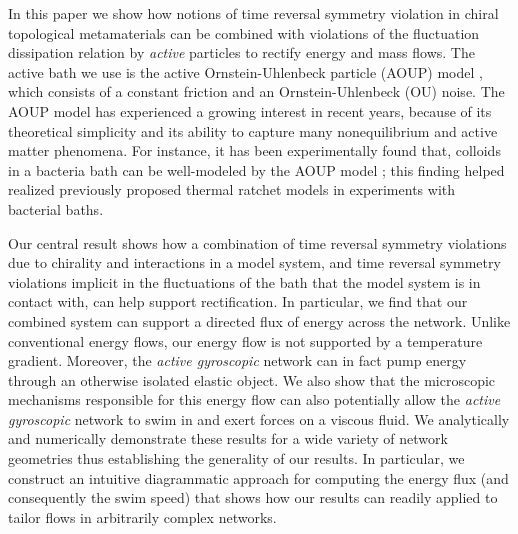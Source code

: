 \documentclass[
 preprint,
 preprintnumbers,
 amsmath,amssymb,
 aps,
 pre,
 longbibliography,
 superscriptaddress,
 10pt, twocolumn
]{revtex4-1}
\begin{document}

In this paper we show how notions of time reversal symmetry violation in chiral topological metamaterials can be combined with violations of the fluctuation dissipation relation by \textit{active} particles to rectify energy and mass flows. The active bath we use is the active Ornstein-Uhlenbeck particle (AOUP) model \cite{Fodor2016HowFar}, which consists of a constant friction and an Ornstein-Uhlenbeck (OU) noise. The AOUP model has experienced a growing interest in recent years, because of its theoretical simplicity and its ability to capture many nonequilibrium and active matter phenomena.
For instance, it has been experimentally found that, colloids in a bacteria bath can be well-modeled by the AOUP model \cite{Wu2000ParticleDiffusion}; this finding helped realized previously proposed thermal ratchet models \cite{Magnasco1993ForcedThermal} in experiments with bacterial baths. \cite{Koumakis2013TargetedDelivery}

Our central result shows how a combination of time reversal symmetry violations due to chirality and interactions in a model system, and time reversal symmetry violations implicit in the fluctuations of the bath that the model system is in contact with, can help support rectification. In particular, we find that our combined system can support a directed flux of energy across the network. Unlike conventional energy flows, our energy flow is not supported by a temperature gradient. Moreover, the \textit{active gyroscopic} network can in fact pump energy through an otherwise isolated elastic object. We also show that the microscopic mechanisms responsible for this energy flow can also potentially allow the \textit{active gyroscopic} network to swim in and exert forces on a viscous fluid. We analytically and numerically demonstrate these results for a wide variety of network geometries thus establishing the generality of our results. In particular, we construct an intuitive diagrammatic approach for computing the energy flux (and consequently the swim speed) that shows how our results can readily applied to tailor flows in arbitrarily complex networks.
\end{document}
